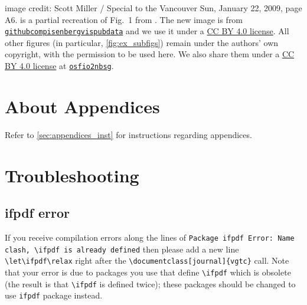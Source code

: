 \documentclass[journal]{vgtc}                     %
\begin{document}
 image credit: Scott Miller / Special to the Vancouver Sun, January 22, 2009, page A6.
 is a partial recreation of Fig.\ 1 from \cite{Isenberg2017Vispubdata.orgMetadataCollection}. The new image is from \href{https://github.com/pisenberg/vispubdata/}{\texttt{githubcom\discretionary{/}{}{/}pisenberg\discretionary{/}{}{/}vispubdata}} and we use it under a \href{https://creativecommons.org/licenses/by/4.0/}{\ccby{} CC BY 4.0 license}. All other figures (in particular, \cref{fig:ex_subfigs}) remain under the authors' own copyright, with the permission to be used here. We also share them under a \href{https://creativecommons.org/licenses/by/4.0/}{\ccby{} CC BY 4.0 license} at \href{https://doi.org/10.17605/OSF.IO/2NBSG}{\texttt{osfio\discretionary{/}{}{/}2nbsg}}.





%
%
%




\appendix %
{} %

\section{About Appendices}
Refer to \cref{sec:appendices_inst} for instructions regarding appendices.

\section{Troubleshooting}
\label{appendix:troubleshooting}

\subsection{ifpdf error}

If you receive compilation errors along the lines of \texttt{Package ifpdf Error: Name clash, \textbackslash ifpdf is already defined} then please add a new line \verb|\let\ifpdf\relax| right after the \verb|\documentclass[journal]{vgtc}| call.
Note that your error is due to packages you use that define \verb|\ifpdf| which is obsolete (the result is that \verb|\ifpdf| is defined twice); these packages should be changed to use \verb|ifpdf| package instead.
\end{document}
